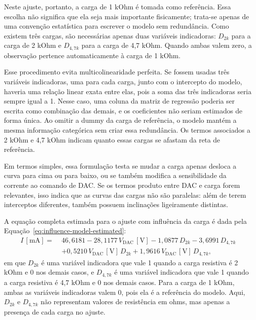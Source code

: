 \documentclass[
  brazilian,
]{article}
\renewcommand{\_}{\oldunderscore\discretionary{}{}{}}
\begin{document}
Neste ajuste, portanto, a carga de 1 kOhm é tomada como referência. Essa
escolha não significa que ela seja mais importante fisicamente; trata-se
apenas de uma convenção estatística para escrever o modelo sem
redundância. Como existem três cargas, são necessárias apenas duas
variáveis indicadoras: \(D_{2k}\) para a carga de 2 kOhm e
\(D_{4{,}7k}\) para a carga de 4,7 kOhm. Quando ambas valem zero, a
observação pertence automaticamente à carga de 1 kOhm.

Esse procedimento evita multicolinearidade perfeita. Se fossem usadas
três variáveis indicadoras, uma para cada carga, junto com o intercepto do
modelo, haveria uma relação linear exata entre elas, pois a soma das três
indicadoras seria sempre igual a 1. Nesse caso, uma coluna da matriz de
regressão poderia ser escrita como combinação das demais, e os
coeficientes não seriam estimados de forma única. Ao omitir a dummy da
carga de referência, o modelo mantém a mesma informação categórica sem
criar essa redundância. Os termos associados a 2 kOhm e 4,7 kOhm indicam
quanto essas cargas se afastam da reta de referência.

Em termos simples, essa formulação testa se mudar a carga apenas desloca
a curva para cima ou para baixo, ou se também modifica a sensibilidade da
corrente ao comando de DAC. Se os termos produto entre DAC e carga forem
relevantes, isso indica que as curvas das cargas não são paralelas: além
de terem interceptos diferentes, também possuem inclinações ligeiramente
distintas.

A equação completa estimada para o ajuste com influência da carga é dada
pela Equação~\ref{eq:influence-model-estimated}:
\begin{equation}
\begin{aligned}
I\,[\mathrm{mA}] =\;& 46{,}6181
- 28{,}1177\,V_{\mathrm{DAC}}\,[\mathrm{V}]
- 1{,}0877\,D_{2k}
- 3{,}6991\,D_{4{,}7k}\\
&+ 0{,}5210\,V_{\mathrm{DAC}}\,[\mathrm{V}]\,D_{2k}
+ 1{,}9616\,V_{\mathrm{DAC}}\,[\mathrm{V}]\,D_{4{,}7k},
\end{aligned}
\label{eq:influence-model-estimated}
\end{equation}
em que \(D_{2k}\) é uma variável indicadora que vale 1 quando a carga
resistiva é 2 kOhm e 0 nos demais casos, e \(D_{4{,}7k}\) é uma variável
indicadora que vale 1 quando a carga resistiva é 4,7 kOhm e 0 nos demais
casos. Para a carga de 1 kOhm, ambas as variáveis indicadoras valem 0,
pois ela é a referência do modelo. Aqui, \(D_{2k}\) e \(D_{4{,}7k}\) não
representam valores de resistência em ohms, mas apenas a presença de cada
carga no ajuste.
\end{document}
